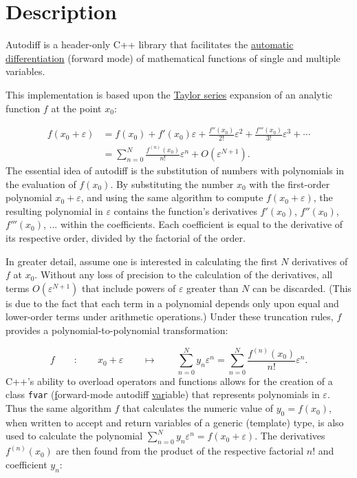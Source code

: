 \documentclass{article}
\begin{document}
\section{Description}

Autodiff is a header-only C++ library that facilitates the
\href{https://en.wikipedia.org/wiki/Automatic_differentiation}{automatic differentiation} (forward mode) of
mathematical functions of single and multiple variables.

This implementation is based upon the \href{https://en.wikipedia.org/wiki/Taylor_series}{Taylor series} expansion of
an analytic function $f$ at the point $x_0$:

\begin{align*}
f(x_0+\varepsilon) &= f(x_0) + f'(x_0)\varepsilon + \frac{f''(x_0)}{2!}\varepsilon^2 + \frac{f'''(x_0)}{3!}\varepsilon^3 + \cdots \\
  &= \sum_{n=0}^N\frac{f^{(n)}(x_0)}{n!}\varepsilon^n + O\left(\varepsilon^{N+1}\right).
\end{align*}
The essential idea of autodiff is the substitution of numbers with polynomials in the evaluation of $f(x_0)$. By
substituting the number $x_0$ with the first-order polynomial $x_0+\varepsilon$, and using the same algorithm
to compute $f(x_0+\varepsilon)$, the resulting polynomial in $\varepsilon$ contains the function's derivatives
$f'(x_0)$, $f''(x_0)$, $f'''(x_0)$, ...  within the coefficients. Each coefficient is equal to the derivative of
its respective order, divided by the factorial of the order.

In greater detail, assume one is interested in calculating the first $N$ derivatives of $f$ at $x_0$. Without any
loss of precision to the calculation of the derivatives, all terms $O\left(\varepsilon^{N+1}\right)$ that include
powers of $\varepsilon$ greater than $N$ can be discarded. (This is due to the fact that each term in a polynomial
depends only upon equal and lower-order terms under arithmetic operations.) Under these truncation rules, $f$
provides a polynomial-to-polynomial transformation:

\[
f \qquad : \qquad x_0+\varepsilon \qquad \mapsto \qquad
    \sum_{n=0}^Ny_n\varepsilon^n=\sum_{n=0}^N\frac{f^{(n)}(x_0)}{n!}\varepsilon^n.
\]
C++'s ability to overload operators and functions allows for the creation of a class {\tt fvar}
(\underline{f}orward-mode autodiff \underline{var}iable) that represents polynomials in $\varepsilon$. Thus
the same algorithm $f$ that calculates the numeric value of $y_0=f(x_0)$, when
written to accept and return variables of a generic (template) type, is also used to calculate the polynomial
$\sum_{n=0}^Ny_n\varepsilon^n=f(x_0+\varepsilon)$. The derivatives $f^{(n)}(x_0)$ are then found from the
product of the respective factorial $n!$ and coefficient $y_n$:
\end{document}

